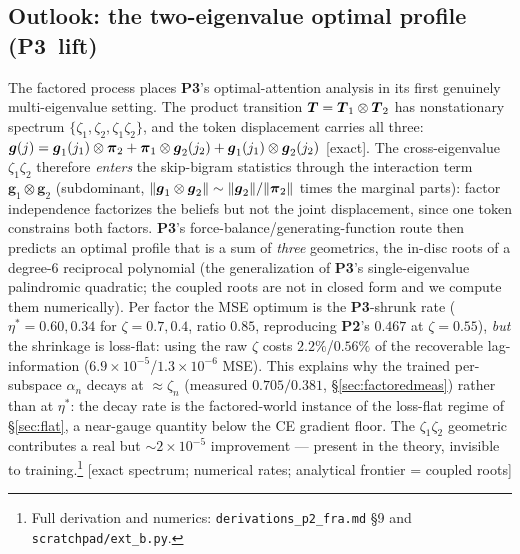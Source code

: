 \documentclass{article}
\newcommand{\gb}{\boldsymbol{g}}
\newcommand{\htag}[1]{{\normalfont\sffamily\footnotesize[#1]}}
\newcommand{\Ptwo}{\textbf{P2}}
\newcommand{\Pthree}{\textbf{P3}}
\begin{document}
\subsection{Outlook: the two-eigenvalue optimal profile (\Pthree\ lift)}\label{sec:p3lift}
The factored process places \Pthree's optimal-attention analysis in its first genuinely
multi-eigenvalue setting. The product transition $\boldsymbol{T}=\boldsymbol{T}_1\otimes\boldsymbol{T}_2$ has
nonstationary spectrum $\{\zeta_1,\zeta_2,\zeta_1\zeta_2\}$, and the token displacement
carries all three:
$\gb(j)=\gb_1(j_1)\otimes\pib_2+\pib_1\otimes\gb_2(j_2)+\gb_1(j_1)\otimes\gb_2(j_2)$
\htag{exact}. The cross-eigenvalue $\zeta_1\zeta_2$ therefore \emph{enters} the
skip-bigram statistics through the interaction term $\gb_1\otimes\gb_2$ (subdominant,
$\|\gb_1\otimes\gb_2\|\sim\|\gb_2\|/\|\pib_2\|$ times the marginal parts): factor
independence factorizes the beliefs but not the joint displacement, since one token
constrains both factors. \Pthree's force-balance/generating-function route then predicts
an optimal profile that is a sum of \emph{three} geometrics, the in-disc roots of a
degree-$6$ reciprocal polynomial (the generalization of \Pthree's single-eigenvalue
palindromic quadratic; the coupled roots are not in closed form and we compute them
numerically). Per factor the MSE optimum is the \Pthree-shrunk rate
($\eta^\ast=0.60,0.34$ for $\zeta=0.7,0.4$, ratio $0.85$, reproducing \Ptwo's $0.467$ at
$\zeta=0.55$), \emph{but} the shrinkage is loss-flat: using the raw $\zeta$ costs
$2.2\%$/$0.56\%$ of the recoverable lag-information
($6.9\times10^{-5}$/$1.3\times10^{-6}$ MSE). This explains why the trained per-subspace
$\alpha_n$ decays at $\approx\zeta_n$ (measured $0.705/0.381$, \S\ref{sec:factoredmeas})
rather than at $\eta^\ast$: the decay rate is the factored-world instance of the
loss-flat regime of \S\ref{sec:flat}, a near-gauge quantity below the CE gradient floor.
The $\zeta_1\zeta_2$ geometric contributes a real but $\sim\!2\times10^{-5}$ improvement
--- present in the theory, invisible to training.\footnote{Full derivation and
numerics: \texttt{derivations\_p2\_fra.md} \S9 and \texttt{scratchpad/ext\_b.py}.}
\htag{exact spectrum; numerical rates; analytical frontier = coupled roots}
\end{document}
